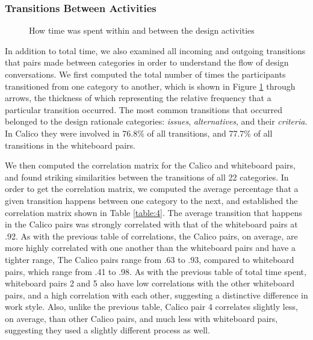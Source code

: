 \subsubsection {Transitions Between Activities}
\label{results:32}

\begin{figure}
\caption{How time was spent within and between the design activities}
\label{fig:13}      
\end{figure}
%

In addition to total time, we also examined all incoming and outgoing transitions that pairs made between categories in order to understand the flow of design conversations. We first computed the total number of times the participants transitioned from one category to another, which is shown in Figure \ref{fig:13} through arrows, the thickness of which representing the relative frequency that a particular transition occurred. The most common transitions that occurred belonged to the design rationale categories: \emph{issues}, \emph{alternatives}, and their \emph{criteria}. In Calico they were involved in 76.8\% of all transitions, and 77.7\% of all transitions in the whiteboard pairs. 

We then computed the correlation matrix for the Calico and whiteboard pairs, and found striking similarities between the transitions of all 22 categories. In order to get the correlation matrix, we computed the average percentage that a given transition happens between one category to the next, and established the correlation matrix shown in Table \ref{table:4}. The average transition that happens in the Calico pairs was strongly correlated with that of the whiteboard pairs at .92. As with the previous table of correlations, the Calico pairs, on average, are more highly correlated with one another than the whiteboard pairs and have a tighter range, The Calico pairs range from .63 to .93, compared to whiteboard pairs, which range from .41 to .98. As with the previous table of total time spent, whiteboard pairs 2 and 5 also have low correlations with the other whiteboard pairs, and a high correlation with each other, suggesting a distinctive difference in work style. Also, unlike the previous table, Calico pair 4 correlates slightly less, on average, than other Calico pairs, and much less with whiteboard pairs, suggesting they used a slightly different process as well.


